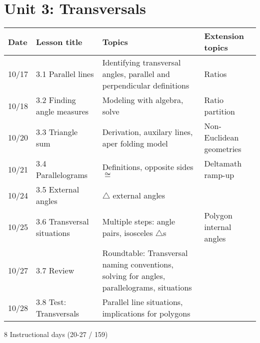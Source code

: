 \section*{Unit 3: Transversals}
\begin{tabular}{|p{0.9cm}|p{4cm}|p{7cm}|p{5cm}|}
  \hline
  Date & Lesson title & Topics  & Extension topics \\
  \hline
  10/17 & 3.1 Parallel lines & Identifying transversal angles, parallel and perpendicular definitions & Ratios \\
  \hline
  10/18 & 3.2 Finding angle measures & Modeling with algebra, solve & Ratio partition \\
  \hline
  10/20 & 3.3 Triangle sum & Derivation, auxilary lines, aper folding model & Non-Euclidean geometries \\
  \hline
  10/21 & 3.4 Parallelograms & Definitions, opposite sides $\cong$ & Deltamath ramp-up \\
  \hline
  10/24 & 3.5 External angles & $\triangle$ external angles &  \\
  \hline
  10/25 & 3.6 Transversal situations & Multiple steps: angle pairs, isosceles $\triangle$s & Polygon internal angles \\
  \hline
  10/27 & 3.7 Review & Roundtable: Transversal naming conventions, solving for angles, parallelograms, situations & \\
  \hline
  10/28 & 3.8 Test: Transversals & Parallel line situations, implications for polygons &  \\
  \hline

\end{tabular} \par \vspace*{0.3cm}
8 Instructional days (20-27 / 159)


\newpage

